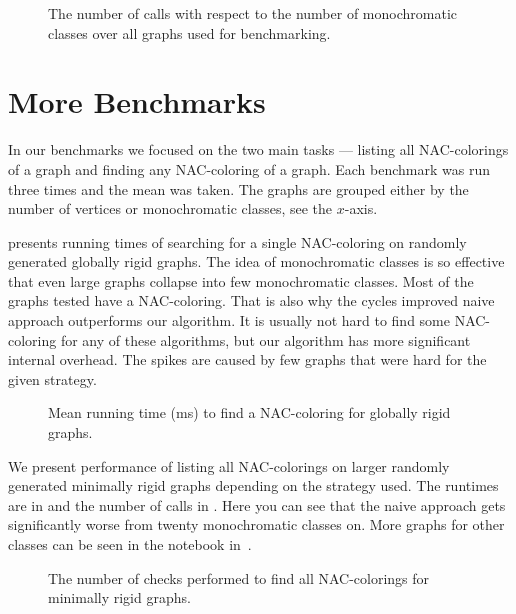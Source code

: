 \begin{figure}[ht]
	\centering
	\scalebox{0.5}{}
	\caption{The number of \IsNACColoring{} calls with respect to the number of monochromatic classes
		over all graphs used for benchmarking.}%
	\label{fig:graph_summary}
\end{figure}

\section{More Benchmarks}%
\label{sec:more_benchmarks}

In our benchmarks
we focused on the two main tasks --- listing
all NAC-colorings of a graph and finding any NAC-coloring of a graph.
Each benchmark was run three times and the mean was taken.
The graphs are grouped either by the number of vertices
or monochromatic classes, see the \(x\)-axis.

 presents running times of
searching for a single NAC-coloring on randomly generated globally rigid graphs.
The idea of monochromatic classes is so effective
that even large graphs collapse into few monochromatic classes.
Most of the graphs tested have a NAC-coloring.
That is also why the cycles improved naive approach outperforms
our algorithm. It is usually not hard to find some NAC-coloring
for any of these algorithms, but our algorithm has more significant
internal overhead.
The spikes are caused by few graphs that
were hard for the given strategy.

\begin{figure}[ht]
	\centering
	\scalebox{0.5}{}
	\caption{Mean running time (ms) to find a NAC-coloring for globally rigid graphs.}%
	\label{fig:graph_time_globally_rigid}
\end{figure}

We present performance of listing all NAC-colorings
on larger randomly generated minimally rigid graphs depending on the strategy used.
The runtimes are in 
and the number of \IsNACColoring{} calls in .
Here you can see that the naive approach gets significantly worse from twenty monochromatic classes on.
More graphs for other classes can be seen in the notebook in~\cite{pyrigi_github_lastaapps}.

\begin{figure}[t]
	\centering
	\scalebox{0.5}{}
	\caption{The number of checks performed to find all NAC-colorings for minimally rigid graphs.}%
	\label{fig:graph_count_minimally_rigid}
\end{figure}

